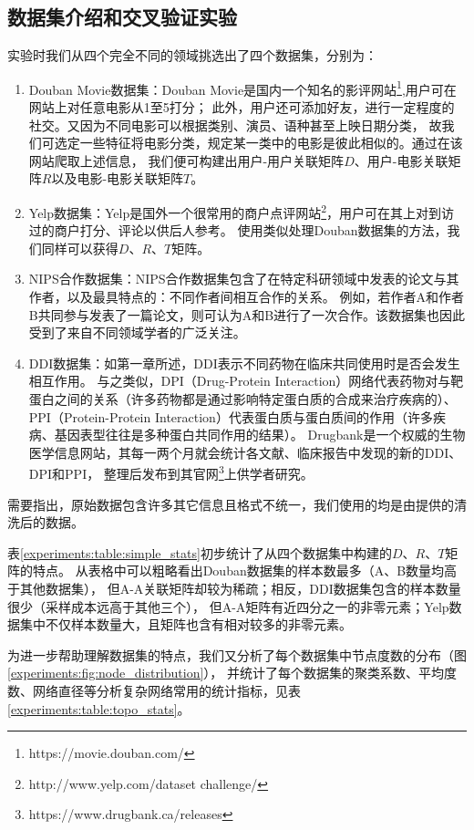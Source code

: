 \subsection{数据集介绍和交叉验证实验}
\label{experiments:sec:db_cv}
实验时我们从四个完全不同的领域挑选出了四个数据集，分别为：
\begin{enumerate}
    \item Douban Movie数据集：Douban Movie是国内一个知名的影评网站\footnote{https://movie.douban.com/},用户可在网站上对任意电影从1至5打分；
    此外，用户还可添加好友，进行一定程度的社交。又因为不同电影可以根据类别、演员、语种甚至上映日期分类，
    故我们可选定一些特征将电影分类，规定某一类中的电影是彼此相似的。通过在该网站爬取上述信息，
    我们便可构建出用户-用户关联矩阵$D$、用户-电影关联矩阵$R$以及电影-电影关联矩阵$T$。
    \item Yelp数据集：Yelp是国外一个很常用的商户点评网站\footnote{http://www.yelp.com/dataset challenge/}，用户可在其上对到访过的商户打分、评论以供后人参考。
    使用类似处理Douban数据集的方法，我们同样可以获得$D$、$R$、$T$矩阵。
    \item NIPS合作数据集：NIPS合作数据集包含了在特定科研领域中发表的论文与其作者，以及最具特点的：不同作者间相互合作的关系。
    例如，若作者A和作者B共同参与发表了一篇论文，则可认为A和B进行了一次合作。该数据集也因此受到了来自不同领域学者的广泛关注。
    \item DDI数据集：如第一章所述，DDI表示不同药物在临床共同使用时是否会发生相互作用。
    与之类似，DPI（Drug-Protein Interaction）网络代表药物对与靶蛋白之间的关系（许多药物都是通过影响特定蛋白质的合成来治疗疾病的）、
    PPI（Protein-Protein Interaction）代表蛋白质与蛋白质间的作用（许多疾病、基因表型往往是多种蛋白共同作用的结果）。
    Drugbank是一个权威的生物医学信息网站，其每一两个月就会统计各文献、临床报告中发现的新的DDI、DPI和PPI，
    整理后发布到其官网\footnote{https://www.drugbank.ca/releases}上供学者研究。
\end{enumerate}


需要指出，原始数据包含许多其它信息且格式不统一，我们使用的均是由\cite{zhang2018prioritizing}提供的清洗后的数据。


表\ref{experiments:table:simple_stats}初步统计了从四个数据集中构建的$D$、$R$、$T$矩阵的特点。
从表格中可以粗略看出Douban数据集的样本数最多（A、B数量均高于其他数据集），
但A-A关联矩阵却较为稀疏；相反，DDI数据集包含的样本数量很少（采样成本远高于其他三个），
但A-A矩阵有近四分之一的非零元素；Yelp数据集中不仅样本数量大，且矩阵也含有相对较多的非零元素。


为进一步帮助理解数据集的特点，我们又分析了每个数据集中节点度数的分布（图\ref{experiments:fig:node_distribution}），
并统计了每个数据集的聚类系数、平均度数、网络直径等分析复杂网络常用的统计指标，见表\ref{experiments:table:topo_stats}。

